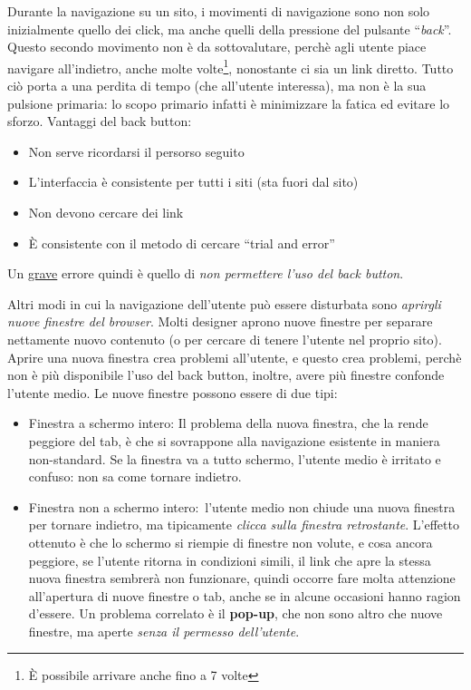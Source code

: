 Durante la navigazione su un sito, i movimenti di navigazione sono non solo inizialmente quello dei click, ma anche quelli della pressione del pulsante ``\textit{back}''. Questo secondo movimento non \`e da sottovalutare, perch\`e agli utente piace navigare all'indietro, anche molte volte\footnote{\`E possibile arrivare anche fino a 7 volte}, nonostante ci sia un link diretto. Tutto ci\`o porta a una perdita di tempo (che all'utente interessa), ma non \`e la sua pulsione primaria: lo scopo primario infatti \`e minimizzare la fatica ed evitare lo sforzo. Vantaggi del back button:
\begin{itemize}

\item Non serve ricordarsi il persorso seguito

\item L'interfaccia \`e consistente per tutti i siti (sta fuori dal sito)

\item Non devono cercare dei link

\item \`E consistente con il metodo di cercare ``trial and error''

\end{itemize}

Un \underline{grave} errore quindi \`e quello di \textit{non permettere l'uso del back button}.

Altri modi in cui la navigazione dell'utente pu\`o essere disturbata sono \textit{aprirgli nuove finestre del browser}. Molti designer aprono nuove finestre per separare nettamente nuovo contenuto (o per cercare di tenere l'utente nel proprio sito). Aprire una nuova finestra crea problemi all'utente, e questo crea problemi, perch\`e non \`e pi\`u disponibile l'uso del back button, inoltre, avere pi\`u finestre confonde l'utente medio. Le nuove finestre possono essere di due tipi:
\begin{itemize}

\item Finestra a schermo intero: Il problema della nuova finestra, che la rende peggiore del tab, \`e che si sovrappone alla navigazione esistente in maniera non-standard. Se la finestra va a tutto schermo, l'utente medio \`e irritato e confuso: non sa come tornare indietro.

\item Finestra non a schermo intero:\ l'utente medio non chiude una nuova finestra per tornare indietro, ma tipicamente \textit{clicca sulla finestra retrostante}. L'effetto ottenuto \`e che lo schermo si riempie di finestre non volute, e cosa ancora peggiore, se l'utente ritorna in condizioni simili, il link che apre la stessa nuova finestra sembrer\`a non funzionare, quindi occorre fare molta attenzione all'apertura di nuove finestre o tab, anche se in alcune occasioni hanno ragion d'essere. Un problema correlato \`e il \textbf{pop-up}, che non sono altro che nuove finestre, ma aperte \textit{senza il permesso dell'utente}.

\end{itemize}
